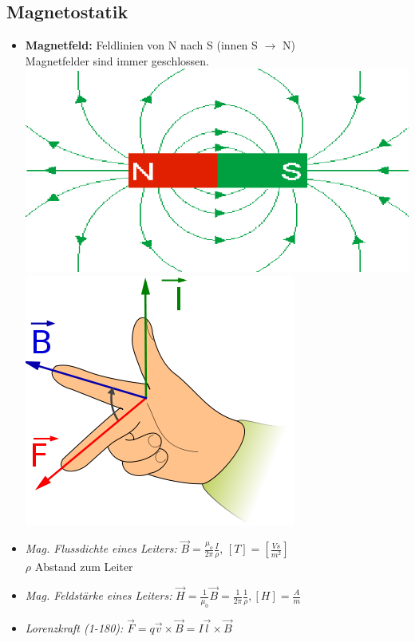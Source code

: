 \documentclass[a4paper, 6pt, landscape]{scrartcl}
\newcommand{\dis}[1]{\hspace{#1cm}}
\begin{document}
\begin{multicols*}{4}
	\section{Magnetostatik}
	\begin{itemize}
		\item \textbf{Magnetfeld:} Feldlinien von N nach S (innen S $\rightarrow$ N)\\
		      Magnetfelder sind immer geschlossen.\\
		      \includegraphics[scale=0.15]{source/magnet.png}\dis{1}
		      \includegraphics[scale=0.18]{source/rightHand.png}
		\item \textit{Mag. Flussdichte eines Leiters:} $\vec{B}=\frac{\mu_o}{2\pi}\frac{I}{\rho}, \, [T]=[\frac{Vs}{m^2}]$\\
		      $\rho$ Abstand zum Leiter
		\item \textit{Mag. Feldstärke eines Leiters:} $\vec{H}=\frac{1}{\mu_0}\vec{B}=\frac{1}{2\pi}\frac{1}{\rho},[H]=\frac{A}{m}$
		\item \textit{Lorenzkraft (1-180):} $\vec{F}=q\vec{v}\times\vec{B}=I\vec{l}\times\vec{B}$

\end{itemize}
\end{multicols*}
\end{document}
